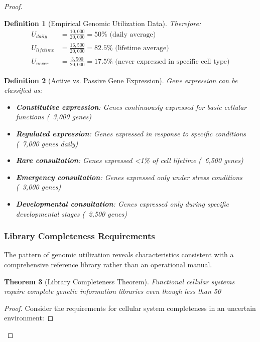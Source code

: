 \documentclass[12pt,a4paper]{article}
\newtheorem{theorem}{Theorem}[section]
\newtheorem{definition}[theorem]{Definition}
\begin{document}
\begin{proof}
\begin{definition}[Empirical Genomic Utilization Data]
Therefore:
\begin{align}
U_{daily} &= \frac{10,000}{20,000} = 50\% \text{ (daily average)} \\
U_{lifetime} &= \frac{16,500}{20,000} = 82.5\% \text{ (lifetime average)} \\
U_{never} &= \frac{3,500}{20,000} = 17.5\% \text{ (never expressed in specific cell type)}
\end{align}
\end{definition}

\begin{definition}[Active vs. Passive Gene Expression]
Gene expression can be classified as:
\begin{itemize}
\item \textbf{Constitutive expression}: Genes continuously expressed for basic cellular functions (~3,000 genes)
\item \textbf{Regulated expression}: Genes expressed in response to specific conditions (~7,000 genes daily)
\item \textbf{Rare consultation}: Genes expressed <1\% of cell lifetime (~6,500 genes)
\item \textbf{Emergency consultation}: Genes expressed only under stress conditions (~3,000 genes)
\item \textbf{Developmental consultation}: Genes expressed only during specific developmental stages (~2,500 genes)
\end{itemize}
\end{definition}

\subsubsection{Library Completeness Requirements}

The pattern of genomic utilization reveals characteristics consistent with a comprehensive reference library rather than an operational manual.

\begin{theorem}[Library Completeness Theorem]
Functional cellular systems require complete genetic information libraries even though less than 50%
\end{theorem}

\begin{proof}
Consider the requirements for cellular system completeness in an uncertain environment:


\end{proof}
\end{proof}
\end{document}
